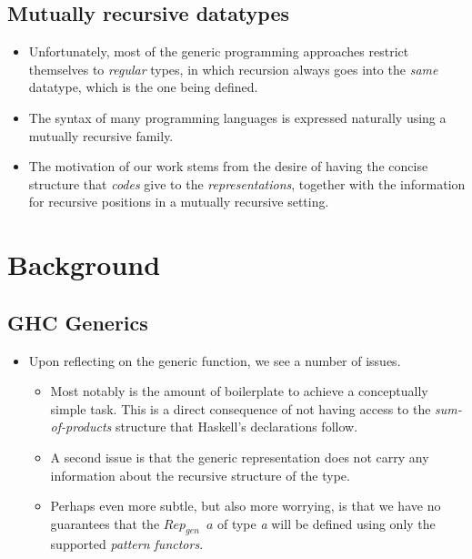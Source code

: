 \subsection{Mutually recursive datatypes}
\begin{itemize}
    \item Unfortunately, most of the generic programming approaches restrict themselves to \textit{regular} types, in which recursion always goes into the \textit{same} datatype, which is the one being defined.
    \item The syntax of many programming languages is expressed naturally using a mutually recursive family. 
    \item The motivation of our work stems from the desire of having the concise structure that \textit{codes} give to the \textit{representations}, together with the information for recursive positions in a mutually recursive setting.
\end{itemize}

\section{Background}
\subsection{GHC Generics}
\begin{itemize}
    \item Upon reflecting on the generic function, we see a number of issues.
    \begin{itemize}
        \item Most notably is the amount of boilerplate to achieve a conceptually simple task. This is a direct consequence of not having access to the \textit{sum-of-products} structure that Haskell's  declarations follow.
        \item A second issue is that the generic representation does not carry any information about the recursive structure of the type.
        \item Perhaps even more subtle, but also more worrying, is that we have no guarantees that the $Rep_{gen} \:\; a$ of type \textit{a} will be defined using only the supported \textit{pattern functors}. 
    \end{itemize}
\end{itemize}

